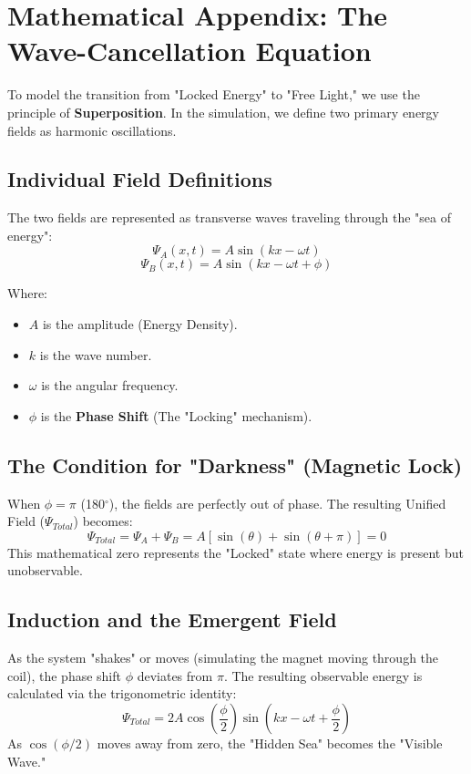 \documentclass[11pt]{article}
\begin{document}
\appendix
\section{Mathematical Appendix: The Wave-Cancellation Equation}

To model the transition from "Locked Energy" to "Free Light," we use the principle of \textbf{Superposition}. In the simulation, we define two primary energy fields as harmonic oscillations.

\subsection{Individual Field Definitions}
The two fields are represented as transverse waves traveling through the "sea of energy":
\begin{equation}
    \Psi_A(x, t) = A \sin(kx - \omega t)
\end{equation}
\begin{equation}
    \Psi_B(x, t) = A \sin(kx - \omega t + \phi)
\end{equation}

Where:
\begin{itemize}
    \item $A$ is the amplitude (Energy Density).
    \item $k$ is the wave number.
    \item $\omega$ is the angular frequency.
    \item $\phi$ is the \textbf{Phase Shift} (The "Locking" mechanism).
\end{itemize}

\subsection{The Condition for "Darkness" (Magnetic Lock)}
When $\phi = \pi$ (180$^\circ$), the fields are perfectly out of phase. The resulting Unified Field ($\Psi_{Total}$) becomes:
\begin{equation}
    \Psi_{Total} = \Psi_A + \Psi_B = A[\sin(\theta) + \sin(\theta + \pi)] = 0
\end{equation}
This mathematical zero represents the "Locked" state where energy is present but unobservable.

\subsection{Induction and the Emergent Field}
As the system "shakes" or moves (simulating the magnet moving through the coil), the phase shift $\phi$ deviates from $\pi$. The resulting observable energy is calculated via the trigonometric identity:
\begin{equation}
    \Psi_{Total} = 2A \cos\left(\frac{\phi}{2}\right) \sin\left(kx - \omega t + \frac{\phi}{2}\right)
\end{equation}
As $\cos(\phi/2)$ moves away from zero, the "Hidden Sea" becomes the "Visible Wave."
\end{document}
